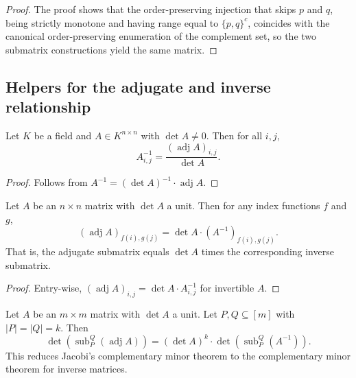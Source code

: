 \begin{proof}
\leanok
The proof shows that the order-preserving injection that skips $p$ and $q$,
being strictly monotone and having range equal to $\{p,q\}^c$, coincides with
the canonical order-preserving enumeration of the complement set, so the two
submatrix constructions yield the same matrix.
\end{proof}

\subsection{Helpers for the adjugate and inverse relationship}

\begin{lemma}
\label{lem.det.inv-eq-adjugate-div}
\leanhelper
\leanok
Let $K$ be a field and $A \in K^{n \times n}$ with $\det A \neq 0$.
Then for all $i, j$,
\[
  A^{-1}_{i,j} = \frac{(\operatorname{adj} A)_{i,j}}{\det A}.
\]
\end{lemma}

\begin{proof}
Follows from $A^{-1} = (\det A)^{-1} \cdot \operatorname{adj} A$.
\end{proof}

\begin{lemma}
\label{lem.det.adjugate-submatrix-eq-smul}
\leanhelper
\leanok
Let $A$ be an $n \times n$ matrix with $\det A$ a unit. Then for any
index functions $f$ and $g$,
\[
  (\operatorname{adj} A)_{f(i), g(j)}
  = \det A \cdot (A^{-1})_{f(i), g(j)}.
\]
That is, the adjugate submatrix equals $\det A$ times the corresponding
inverse submatrix.
\end{lemma}

\begin{proof}
Entry-wise, $(\operatorname{adj} A)_{i,j} = \det A \cdot A^{-1}_{i,j}$
for invertible $A$.
\end{proof}

\begin{lemma}
\label{lem.det.det-adjugate-submatrix-finset}
\leanhelper
\leanok
Let $A$ be an $m \times m$ matrix with $\det A$ a unit.
Let $P, Q \subseteq [m]$ with $|P| = |Q| = k$. Then
\[
  \det\!\left(\operatorname{sub}_P^Q(\operatorname{adj} A)\right)
  = (\det A)^k \cdot \det\!\left(\operatorname{sub}_P^Q(A^{-1})\right).
\]
This reduces Jacobi's complementary minor theorem to the complementary
minor theorem for inverse matrices.
\end{lemma}

